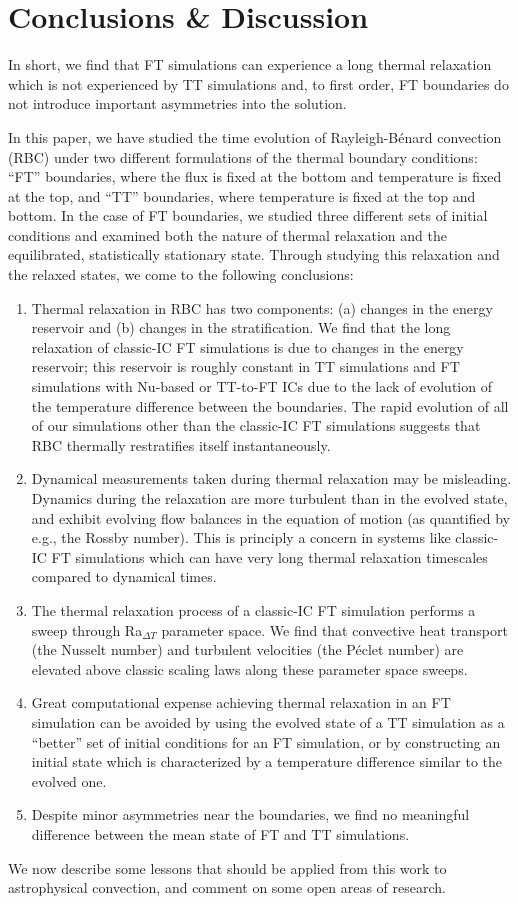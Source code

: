 \documentclass[aps, pre, onecolumn, nofootinbib, notitlepage, groupedaddress, amsfonts, amssymb, amsmath, longbibliography, superscriptaddress]{revtex4-1}
\newcommand{\RB}{Rayleigh-B\'{e}nard }
\begin{document}
\section{Conclusions \& Discussion}
\label{sec:discussion}
In short, we find that FT simulations can experience a long thermal relaxation which is not experienced by TT simulations and, to first order, FT boundaries do not introduce important asymmetries into the solution.

In this paper, we have studied the time evolution of \RB convection (RBC) under two different formulations of the thermal boundary conditions: ``FT'' boundaries, where the flux is fixed at the bottom and temperature is fixed at the top, and ``TT'' boundaries, where temperature is fixed at the top and bottom.
In the case of FT boundaries, we studied three different sets of initial conditions and examined both the nature of thermal relaxation and the equilibrated, statistically stationary state.
Through studying this relaxation and the relaxed states, we come to the following conclusions:
\begin{enumerate}
\item Thermal relaxation in RBC has two components: (a) changes in the energy reservoir and (b) changes in the stratification.
We find that the long relaxation of classic-IC FT simulations is due to changes in the energy reservoir; this reservoir is roughly constant in TT simulations and FT simulations with Nu-based or TT-to-FT ICs due to the lack of evolution of the temperature difference between the boundaries.
The rapid evolution of all of our simulations other than the classic-IC FT simulations suggests that RBC thermally restratifies itself instantaneously.
\item Dynamical measurements taken during thermal relaxation may be misleading.
Dynamics during the relaxation are more turbulent than in the evolved state, and exhibit evolving flow balances in the equation of motion (as quantified by e.g., the Rossby number).
This is principly a concern in systems like classic-IC FT simulations which can have very long thermal relaxation timescales compared to dynamical times.
\item The thermal relaxation process of a classic-IC FT simulation performs a sweep through Ra$_{\Delta T}$ parameter space.
We find that convective heat transport (the Nusselt number) and turbulent velocities (the P\'{e}clet number) are elevated above classic scaling laws along these parameter space sweeps.
\item Great computational expense achieving thermal relaxation in an FT simulation can be avoided by using the evolved state of a TT simulation as a ``better'' set of initial conditions for an FT simulation, or by constructing an initial state which is characterized by a temperature difference similar to the evolved one.
\item Despite minor asymmetries near the boundaries, we find no meaningful difference between the mean state of FT and TT simulations.
\end{enumerate}
We now describe some lessons that should be applied from this work to astrophysical convection, and comment on some open areas of research.
\end{document}
